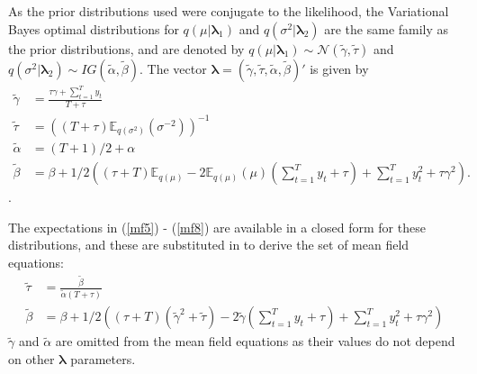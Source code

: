 \documentclass[12pt,a4paper]{article}%
\numberwithin{equation}{section}
\begin{document}
As the prior distributions used were conjugate to the likelihood, the Variational Bayes optimal distributions for $q(\mu |  \boldsymbol{\lambda}_1)$ and $q(\sigma^2 | \boldsymbol{\lambda}_2)$ are the same family as the prior distributions, and are denoted by $q(\mu | \boldsymbol{\lambda}_1) \sim \mathcal{N}(\tilde{\gamma}, \tilde{\tau})$ and $q(\sigma^2 | \boldsymbol{\lambda}_2) \sim IG(\tilde{\alpha}, \tilde{\beta})$. The vector $\boldsymbol{\lambda} = (\tilde{\gamma}, \tilde{\tau}, \tilde{\alpha}, \tilde{\beta})'$ is given by
\begin{align}
\tilde{\gamma} &= \frac{\tau \gamma + \sum_{t=1}^{T} y_t}{T + \tau}  \label{mf5} \\ 
\tilde{\tau} &= \left((T + \tau)\mathbb{E}_{q(\sigma^2)}(\sigma^{-2})\right )^{-1} \label{mf6} \\
\tilde{\alpha} &= (T+1)/2 + \alpha  \label{mf7} \\
\tilde{\beta} &= \beta + 1/2\left((\tau + T)\mathbb{E}_{q(\mu)} - 2 \mathbb{E}_{q(\mu)}(\mu)(\sum_{t=1}^{T}y_t + \tau) + \sum_{t=1}^{T} y_t^2 + \tau \gamma^2 \right). \label{mf8}
\end{align}.

The expectations in (\ref{mf5}) - (\ref{mf8}) are available in a closed form for these distributions, and these are substituted in to derive the set of mean field equations:
\begin{align}
\tilde{\tau} &= \frac{\tilde{\beta}}{\tilde{\alpha}(T + \tau)} \label{mf9} \\
\tilde{\beta} &= \beta + 1/2\left((\tau + T)(\tilde{\gamma}^2 + \tilde{\tau}) - 2 \tilde{\gamma}(\sum_{t=1}^{T}y_t + \tau) + \sum_{t=1}^{T} y_t^2 + \tau \gamma^2 \right)\label{mf10}
\end{align}
$\tilde{\gamma}$ and $\tilde{\alpha}$ are omitted from the mean field equations as their values do not depend on other $\boldsymbol{\lambda}$ parameters. 
\end{document}
